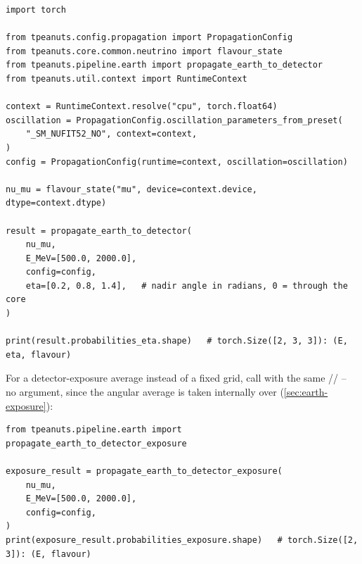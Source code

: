 \begin{examplebox}[title={A pure $\nu_\mu$ beam crossing the Earth on a nadir-angle grid}]
\begin{lstlisting}[style=tpython]
import torch

from tpeanuts.config.propagation import PropagationConfig
from tpeanuts.core.common.neutrino import flavour_state
from tpeanuts.pipeline.earth import propagate_earth_to_detector
from tpeanuts.util.context import RuntimeContext

context = RuntimeContext.resolve("cpu", torch.float64)
oscillation = PropagationConfig.oscillation_parameters_from_preset(
    "_SM_NUFIT52_NO", context=context,
)
config = PropagationConfig(runtime=context, oscillation=oscillation)

nu_mu = flavour_state("mu", device=context.device, dtype=context.dtype)

result = propagate_earth_to_detector(
    nu_mu,
    E_MeV=[500.0, 2000.0],
    config=config,
    eta=[0.2, 0.8, 1.4],   # nadir angle in radians, 0 = through the core
)

print(result.probabilities_eta.shape)   # torch.Size([2, 3, 3]): (E, eta, flavour)
\end{lstlisting}
\end{examplebox}

For a detector-exposure average instead of a fixed grid, call
 with the same
// -- no  argument, since
the angular average is taken internally over
 (\cref{sec:earth-exposure}):
\begin{examplebox}[title={The same beam, averaged over the configured detector exposure}]
\begin{lstlisting}[style=tpython]
from tpeanuts.pipeline.earth import propagate_earth_to_detector_exposure

exposure_result = propagate_earth_to_detector_exposure(
    nu_mu,
    E_MeV=[500.0, 2000.0],
    config=config,
)
print(exposure_result.probabilities_exposure.shape)   # torch.Size([2, 3]): (E, flavour)
\end{lstlisting}
\end{examplebox}
